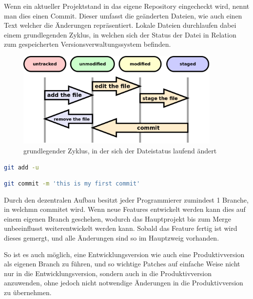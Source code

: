 Wenn ein aktueller Projektstand in das eigene Repository eingecheckt wird, nennt man dies einen Commit. Dieser umfasst die ge\"anderten Dateien, wie auch einen Text welcher die \"Anderungen repr\"asentiert. Lokale Dateien durchlaufen dabei einem grundlegenden Zyklus, in welchen sich der Status der Datei in Relation zum gespeicherten Versionsverwaltungssystem befinden.

\begin{figure}[h]
\centering
\includegraphics[width=0.9\textwidth]{./media/images/development/git_file_status_livecycle.png}
\caption{grundlegender Zyklus, in der sich der Dateistatus laufend \"andert}
\label{git_file_status_livecycle}
\end{figure}


\begin{lstlisting}[language=bash]
git add -u
\end{lstlisting}


\begin{lstlisting}[language=bash]
git commit -m 'this is my first commit'
\end{lstlisting}

\newpage

Durch den dezentralen Aufbau besitzt jeder Programmierer zumindest 1 Branche, in welchmn commitet wird. Wenn neue Features entwickelt werden kann dies auf einem eigenen Branch geschehen, wodurch das Hauptprojekt bis zum Merge unbeeinflusst weiterentwickelt werden kann. Sobald das Feature fertig ist wird dieses gemergt, und alle \"Anderungen sind so im Hauptzweig vorhanden.

So ist es auch m\"oglich, eine Entwicklungsversion wie auch eine Produktivversion als eigenen Branch zu f\"uhren, und so wichtige Patches auf einfache Weise nicht nur in die Entwicklungsversion, sondern auch in die Produktivversion anzuwenden, ohne jedoch nicht notwendige \"Anderungen in die Produktivversion zu \"ubernehmen.

